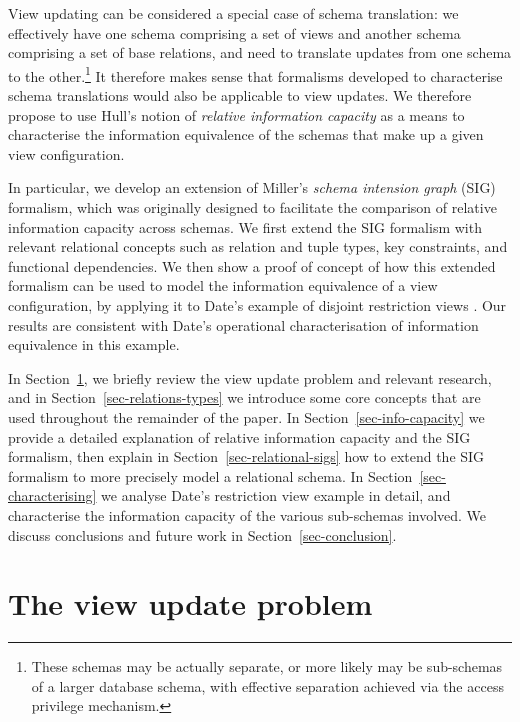\documentclass{sig-alternate-05-2015}
\newcounter{constraint}
\begin{document}
View updating can be considered a special case of schema translation: we effectively have one schema comprising a set of views and another schema comprising a set of base relations, and need to translate updates from one schema to the other.\footnote{These schemas may be actually separate, or more likely may be sub-schemas of a larger database schema, with effective separation achieved via the access privilege mechanism.} It therefore makes sense that formalisms developed to characterise sche\-ma translations would also be applicable to view updates. We therefore propose to use Hull's notion of \emph{relative information capacity} \cite{Hull.R-1986a-Relative} as a means to characterise the information equivalence of the schemas that make up a given view configuration.

In particular, we develop an extension of Miller's \emph{schema intension graph} (SIG) formalism, which was originally designed to facilitate the comparison of relative information capacity across schemas. We first extend the SIG formalism with relevant relational concepts such as relation and tuple types, key constraints, and functional dependencies. We then show a proof of concept of how this extended formalism can be used to model the information equivalence of a view configuration, by applying it to Date's example of disjoint restriction views \cite{Date.C-2013a-View}. Our results are consistent with Date's operational characterisation of information equivalence in this example.

In Section~\ref{sec-view-update-problem}, we briefly review the view update problem and relevant research, and in Section~\ref{sec-relations-types} we introduce some core concepts that are used throughout the remainder of the paper. In Section~\ref{sec-info-capacity} we provide a detailed explanation of relative information capacity and the SIG formalism, then explain in Section~\ref{sec-relational-sigs} how to extend the SIG formalism to more precisely model a relational schema. In Section~\ref{sec-characterising} we analyse Date's restriction view example \cite{Date.C-2013a-View} in detail, and characterise the information capacity of the various sub-schemas involved. We discuss conclusions and future work in Section~\ref{sec-conclusion}.




\section{The view update problem}
\label{sec-view-update-problem}
\end{document}
